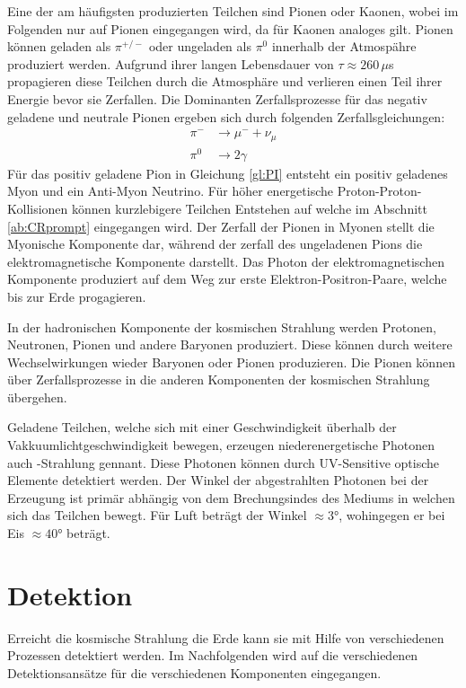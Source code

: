Eine der am häufigsten produzierten Teilchen sind Pionen oder Kaonen, wobei im Folgenden nur auf Pionen eingegangen wird, da für Kaonen analoges gilt. Pionen können geladen als $\pi^{+/-}$ oder ungeladen als $\pi^0$ innerhalb der Atmospähre produziert werden. Aufgrund ihrer langen Lebensdauer von $\tau \approx 260$\,$\mu$s propagieren diese Teilchen durch die Atmosphäre und verlieren einen Teil ihrer Energie bevor sie Zerfallen. Die Dominanten Zerfallsprozesse für das negativ geladene und neutrale Pionen ergeben sich durch folgenden Zerfallsgleichungen:
\begin{align}
\pi^{-} &\rightarrow \mu^{-} + \nu_\mu \label{gl:PI} \\
\pi^0 &\rightarrow 2\gamma \label{gl:GAMMA}
\end{align}
Für das positiv geladene Pion in Gleichung \ref{gl:PI} entsteht ein positiv geladenes Myon und ein Anti-Myon Neutrino. Für höher energetische Proton-Proton-Kollisionen können kurzlebigere Teilchen Entstehen auf welche im Abschnitt \ref{ab:CRprompt} eingegangen wird. Der Zerfall der Pionen in Myonen stellt die Myonische Komponente dar, während der zerfall des ungeladenen Pions die elektromagnetische Komponente darstellt. Das Photon der elektromagnetischen Komponente produziert auf dem Weg zur erste Elektron-Positron-Paare, welche bis zur Erde progagieren.

In der hadronischen Komponente der kosmischen Strahlung werden Protonen, Neutronen, Pionen und andere Baryonen produziert. Diese können durch weitere Wechselwirkungen wieder Baryonen oder Pionen produzieren. Die Pionen können über Zerfallsprozesse in die anderen Komponenten der kosmischen Strahlung übergehen. 

Geladene Teilchen, welche sich mit einer Geschwindigkeit überhalb der Vakkuumlichtgeschwindigkeit bewegen, erzeugen niederenergetische Photonen auch \CH -Strahlung gennant. Diese Photonen können durch UV-Sensitive optische Elemente detektiert werden. Der Winkel der abgestrahlten Photonen bei der Erzeugung ist primär abhängig von dem Brechungsindes des Mediums in welchen sich das Teilchen bewegt. Für Luft beträgt der Winkel $\approx 3$°, wohingegen er bei Eis $\approx 40$° beträgt.
\section{Detektion}
Erreicht die kosmische Strahlung die Erde kann sie mit Hilfe von verschiedenen Prozessen detektiert werden. Im Nachfolgenden wird auf die verschiedenen Detektionsansätze für die verschiedenen Komponenten eingegangen.

